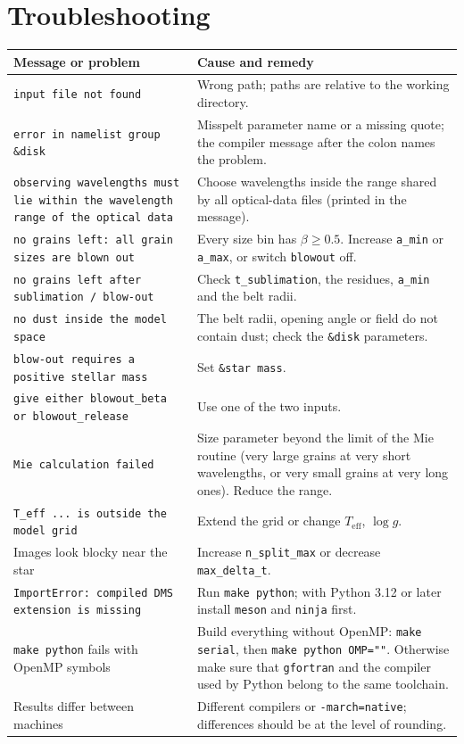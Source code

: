 \documentclass[11pt,a4paper]{article}
\newcommand{\code}[1]{\texttt{#1}}
\begin{document}
\section{Troubleshooting}
\label{sec:trouble}

\small
\begin{longtable}{@{}R{6.1cm}R{8.8cm}@{}}
\toprule
Message or problem & Cause and remedy \\
\midrule
\endhead
\code{input file not found} & Wrong path; paths are relative to the working directory. \\
\code{error in namelist group \&disk} & Misspelt parameter name or a missing quote; the compiler
  message after the colon names the problem. \\
\code{observing wavelengths must lie within the wavelength range of the optical data} & Choose
  wavelengths inside the range shared by all optical-data files (printed in the message). \\
\code{no grains left: all grain sizes are blown out} & Every size bin has $\beta\ge0.5$. Increase
  \code{a\_min} or \code{a\_max}, or switch \code{blowout} off. \\
\code{no grains left after sublimation / blow-out} & Check \code{t\_sublimation}, the residues,
  \code{a\_min} and the belt radii. \\
\code{no dust inside the model space} & The belt radii, opening angle or field do not contain dust;
  check the \code{\&disk} parameters. \\
\code{blow-out requires a positive stellar mass} & Set \code{\&star mass}. \\
\code{give either blowout\_beta or blowout\_release} & Use one of the two inputs. \\
\code{Mie calculation failed} & Size parameter beyond the limit of the Mie routine (very large grains
  at very short wavelengths, or very small grains at very long ones). Reduce the range. \\
\code{T\_eff ... is outside the model grid} & Extend the grid or change $T_\mathrm{eff}$, $\log g$. \\
Images look blocky near the star & Increase \code{n\_split\_max} or decrease \code{max\_delta\_t}. \\
\code{ImportError: compiled DMS extension is missing} & Run \code{make python}; with Python 3.12 or
  later install \code{meson} and \code{ninja} first. \\
\code{make python} fails with OpenMP symbols & Build everything without OpenMP:
  \code{make serial}, then \code{make python OMP=""}. Otherwise make sure that \code{gfortran} and
  the compiler used by Python belong to the same toolchain. \\
Results differ between machines & Different compilers or \code{-march=native}; differences should be
  at the level of rounding. \\
\bottomrule
\end{longtable}
\normalsize
\end{document}
